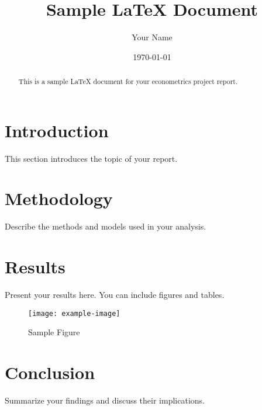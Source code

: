 \documentclass[12px]{article}
\title{Sample LaTeX Document}
\author{Your Name}
\date{\today}
\begin{document}
\maketitle

\begin{abstract}
This is a sample LaTeX document for your econometrics project report.
\end{abstract}

\section{Introduction}
This section introduces the topic of your report.

\section{Methodology}
Describe the methods and models used in your analysis.

\section{Results}
Present your results here. You can include figures and tables.

\begin{figure}[h]
    \centering
    \texttt{[image: example-image]}
    \caption{Sample Figure}
    \label{fig:sample}
\end{figure}

\section{Conclusion}
Summarize your findings and discuss their implications.



\end{document}
